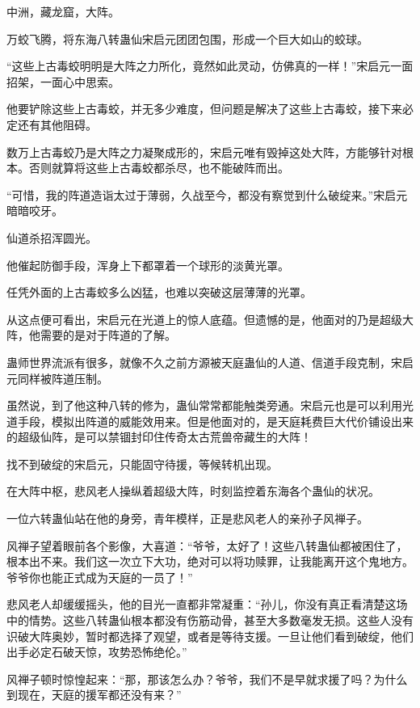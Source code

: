 
\begin{this_body}

中洲，藏龙窟，大阵。

万蛟飞腾，将东海八转蛊仙宋启元团团包围，形成一个巨大如山的蛟球。

“这些上古毒蛟明明是大阵之力所化，竟然如此灵动，仿佛真的一样！”宋启元一面招架，一面心中思索。

他要铲除这些上古毒蛟，并无多少难度，但问题是解决了这些上古毒蛟，接下来必定还有其他阻碍。

数万上古毒蛟乃是大阵之力凝聚成形的，宋启元唯有毁掉这处大阵，方能够针对根本。否则就算将这些上古毒蛟都杀尽，也不能破阵而出。

“可惜，我的阵道造诣太过于薄弱，久战至今，都没有察觉到什么破绽来。”宋启元暗暗咬牙。

仙道杀招浑圆光。

他催起防御手段，浑身上下都罩着一个球形的淡黄光罩。

任凭外面的上古毒蛟多么凶猛，也难以突破这层薄薄的光罩。

从这点便可看出，宋启元在光道上的惊人底蕴。但遗憾的是，他面对的乃是超级大阵，他需要的是对于阵道的了解。

蛊师世界流派有很多，就像不久之前方源被天庭蛊仙的人道、信道手段克制，宋启元同样被阵道压制。

虽然说，到了他这种八转的修为，蛊仙常常都能触类旁通。宋启元也是可以利用光道手段，模拟出阵道的威能效用来。但是他面对的，是天庭耗费巨大代价铺设出来的超级仙阵，是可以禁锢封印住传奇太古荒兽帝藏生的大阵！

找不到破绽的宋启元，只能固守待援，等候转机出现。

在大阵中枢，悲风老人操纵着超级大阵，时刻监控着东海各个蛊仙的状况。

一位六转蛊仙站在他的身旁，青年模样，正是悲风老人的亲孙子风禅子。

风禅子望着眼前各个影像，大喜道：“爷爷，太好了！这些八转蛊仙都被困住了，根本出不来。我们这一次立下大功，绝对可以将功赎罪，让我能离开这个鬼地方。爷爷你也能正式成为天庭的一员了！”

悲风老人却缓缓摇头，他的目光一直都非常凝重：“孙儿，你没有真正看清楚这场中的情势。这些八转蛊仙根本都没有伤筋动骨，甚至大多数毫发无损。这些人没有识破大阵奥妙，暂时都选择了观望，或者是等待支援。一旦让他们看到破绽，他们出手必定石破天惊，攻势恐怖绝伦。”

风禅子顿时惊惶起来：“那，那该怎么办？爷爷，我们不是早就求援了吗？为什么到现在，天庭的援军都还没有来？”


\end{this_body}
